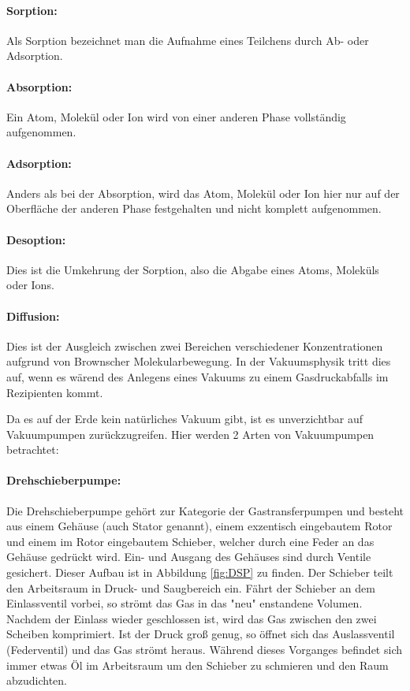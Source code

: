 \paragraph{Sorption:}
Als Sorption bezeichnet man die Aufnahme eines Teilchens durch Ab- oder Adsorption.

\paragraph{Absorption:}
Ein Atom, Molekül oder Ion wird von einer anderen Phase vollständig
aufgenommen.

\paragraph{Adsorption:}
Anders als bei der Absorption, wird das Atom, Molekül oder Ion hier nur auf der Oberfläche der anderen Phase
festgehalten und nicht komplett aufgenommen.

\paragraph{Desoption:}
Dies ist die Umkehrung der Sorption, also die Abgabe eines Atoms, Moleküls oder Ions.

 \paragraph{Diffusion:}
 Dies ist der Ausgleich zwischen zwei Bereichen verschiedener Konzentrationen
 aufgrund von Brownscher Molekularbewegung. In der Vakuumsphysik tritt dies auf, wenn es wärend des Anlegens eines
 Vakuums zu einem Gasdruckabfalls im Rezipienten kommt.

 Da es auf der Erde kein natürliches Vakuum gibt, ist es unverzichtbar auf Vakuumpumpen zurückzugreifen. Hier werden
 2 Arten von Vakuumpumpen betrachtet:

 \paragraph{Drehschieberpumpe:}
 Die Drehschieberpumpe gehört zur Kategorie der Gastransferpumpen und besteht aus einem Gehäuse (auch Stator genannt), einem
 exzentisch eingebautem Rotor und einem im Rotor eingebautem Schieber, welcher durch eine Feder an das Gehäuse gedrückt wird.
 Ein- und Ausgang des Gehäuses sind durch Ventile gesichert. Dieser Aufbau ist in Abbildung \ref{fig:DSP} zu finden.
 Der Schieber teilt den Arbeitsraum in Druck- und Saugbereich ein. Fährt der Schieber an dem Einlassventil vorbei, so strömt
 das Gas in das "neu" enstandene Volumen. Nachdem der Einlass wieder geschlossen ist, wird das Gas zwischen den zwei Scheiben komprimiert.
 Ist der Druck groß genug, so öffnet sich das Auslassventil (Federventil) und das Gas strömt heraus. Während dieses Vorganges
 befindet sich immer etwas Öl im Arbeitsraum um den Schieber zu schmieren und den Raum abzudichten.


